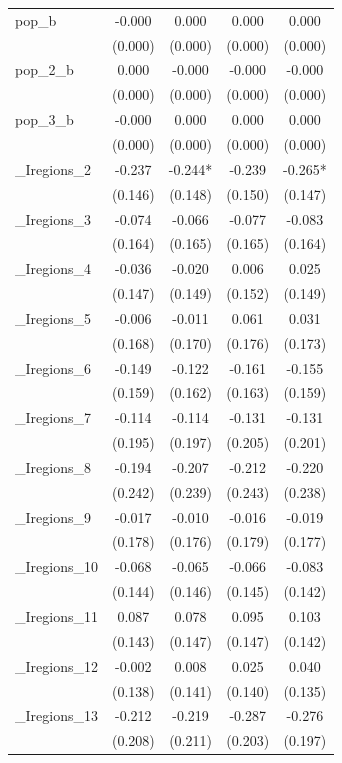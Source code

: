 \documentclass[]{article}
\begin{document}
\begin{tabular}{lcccc}
pop\_b & -0.000 & 0.000 & 0.000 & 0.000 \\
 & (0.000) & (0.000) & (0.000) & (0.000) \\
pop\_2\_b & 0.000 & -0.000 & -0.000 & -0.000 \\
 & (0.000) & (0.000) & (0.000) & (0.000) \\
pop\_3\_b & -0.000 & 0.000 & 0.000 & 0.000 \\
 & (0.000) & (0.000) & (0.000) & (0.000) \\
\_Iregions\_2 & -0.237 & -0.244* & -0.239 & -0.265* \\
 & (0.146) & (0.148) & (0.150) & (0.147) \\
\_Iregions\_3 & -0.074 & -0.066 & -0.077 & -0.083 \\
 & (0.164) & (0.165) & (0.165) & (0.164) \\
\_Iregions\_4 & -0.036 & -0.020 & 0.006 & 0.025 \\
 & (0.147) & (0.149) & (0.152) & (0.149) \\
\_Iregions\_5 & -0.006 & -0.011 & 0.061 & 0.031 \\
 & (0.168) & (0.170) & (0.176) & (0.173) \\
\_Iregions\_6 & -0.149 & -0.122 & -0.161 & -0.155 \\
 & (0.159) & (0.162) & (0.163) & (0.159) \\
\_Iregions\_7 & -0.114 & -0.114 & -0.131 & -0.131 \\
 & (0.195) & (0.197) & (0.205) & (0.201) \\
\_Iregions\_8 & -0.194 & -0.207 & -0.212 & -0.220 \\
 & (0.242) & (0.239) & (0.243) & (0.238) \\
\_Iregions\_9 & -0.017 & -0.010 & -0.016 & -0.019 \\
 & (0.178) & (0.176) & (0.179) & (0.177) \\
\_Iregions\_10 & -0.068 & -0.065 & -0.066 & -0.083 \\
 & (0.144) & (0.146) & (0.145) & (0.142) \\
\_Iregions\_11 & 0.087 & 0.078 & 0.095 & 0.103 \\
 & (0.143) & (0.147) & (0.147) & (0.142) \\
\_Iregions\_12 & -0.002 & 0.008 & 0.025 & 0.040 \\
 & (0.138) & (0.141) & (0.140) & (0.135) \\
\_Iregions\_13 & -0.212 & -0.219 & -0.287 & -0.276 \\
 & (0.208) & (0.211) & (0.203) & (0.197) \\

\end{tabular}
\end{document}
